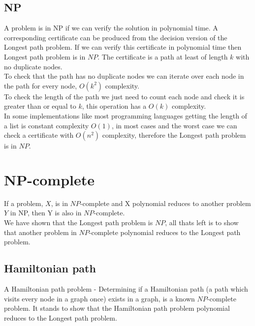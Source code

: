 \documentclass[a4paper,11pt]{article}
\begin{document}
    \subsection{NP}
    A problem is in NP if we can verify the solution in polynomial time. A 
    corresponding certificate can be produced from the decision version of the 
    Longest path problem. If we can verify this certificate in polynomial time 
    then Longest path problem is in $NP$. The certificate is a path at least of 
    length $k$ with no duplicate nodes.\\ 
    To check that the path has no duplicate nodes we can iterate over each node
     in the path for every node, $O(k^2)$ complexity. 
    \\To check the length of the path we just need to count each node
    and check it is greater than or equal to $k$, this operation has a $O(k)$ 
    complexity. 
    \\In some implementations like most programming languages getting the length of 
    a list is constant complexity $O(1)$, in most cases and the worst 
    case we can check a certificate with $O(n^2)$ complexity, therefore the
    Longest path problem is in $NP$.

\section{NP-complete}
If a problem, $X$, is in $NP$-complete and X polynomial reduces to another 
problem $Y$ in NP, then Y is also in $NP$-complete.\\
We have shown that the Longest path problem is $NP$, all thats left is to show 
that another problem in $NP$-complete polynomial reduces to the Longest path 
problem.
\subsection{Hamiltonian path}
A Hamiltonian path problem - Determining if a Hamiltonian path (a path which 
visits every node in a graph once) exists in a graph, is a known $NP$-complete
problem. It stands to show that the Hamiltonian path problem polynomial reduces 
to the Longest path problem.
\end{document}
